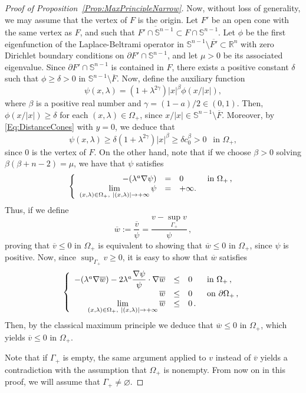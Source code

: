 \documentclass[12pt,reqno]{amsart}
\theoremstyle{definition}
\theoremstyle{remark}
\newcommand{\con}[1]{\mathbb{#1}}
\newcommand{\R}{\con{R}} %
\newcommand{\Sph}{\con{S}} %
\newcommand{\s}{\gamma}
\newcommand\beqc[1]{\left\{\begin{array}{#1}}
\newcommand\eeqc{\end{array} \right.}
\def\PDEsystem{rcll}
\let\div\relax
\DeclareMathOperator{\div}{div}
\def\ds{\displaystyle}
\numberwithin{equation}{section}
\begin{document}
\begin{proof}[Proof of Proposition~\ref{Prop:MaxPrincipleNarrow}]
	Now, without loss of generality, we may assume that the vertex of $F$ is the origin. Let $F'$ be an open cone with the same vertex as $F$, and such that $\overline{F'\cap \Sph^{n-1}} \subset F\cap \Sph^{n-1}$. Let $\phi$ be the first eigenfunction of the Laplace-Beltrami operator in $\Sph^{n-1} \setminus \overline{F'}\subset \R^n$ with zero Dirichlet boundary conditions on $\partial F' \cap \Sph^{n-1}$, and let $\mu>0$ be its associated eigenvalue. Since $\partial F' \cap \Sph^{n-1}$ is contained in $F$, there exists a positive constant $\delta$ such that $\phi\geq \delta > 0$ in $\Sph^{n-1} \setminus \overline{F}$. Now, define the auxiliary function
	$$ 
	\psi(x,\lambda) = (1+\lambda^{2\s}) |x|^\beta \phi(x/|x|), 
	$$
	where $\beta$ is a positive real number and $\s = (1-a)/2 \in (0,1)$. Then, $\phi(x/|x|)\geq \delta$ for each $(x,\lambda) \in \Omega_+$,  since $x/|x| \in \Sph^{n-1} \setminus \overline{F}$. Moreover, by \eqref{Eq:DistanceCones} with $y=0$, we deduce that
	$$ 
	\psi(x,\lambda) \geq \delta (1+\lambda^{2\s}) |x|^\beta \geq \delta c_0^\beta > 0 \ \ \text{ in } \Omega_+,
	$$
	since $0$ is the vertex of $F$.
	On the other hand, note that if we choose $\beta>0$ solving $\beta(\beta+n-2)=\mu$, we have that $\psi$ satisfies
	$$
	\beqc{\PDEsystem}
	-\div(\lambda^a \nabla \psi) &=& 0 & \text{ in } \Omega_+\,, \\
	\ds \lim_{(x,\lambda)\in \Omega_+, \ |(x,\lambda)|\to +\infty} \psi & = & +\infty.
	\eeqc
	$$
	Thus, if we define 
	$$\overline{w}:=\dfrac{\overline{v} }{\psi} = \dfrac{v - \sup_{\Gamma_+} v}{\psi}\,,$$
	proving that $\overline{v} \leq 0$ in $\Omega_+$ is equivalent to showing that $\overline{w}\leq 0$ in $\Omega_+$, since $\psi$ is positive. Now, since $\sup_{\Gamma_+} v \geq 0$, it is easy to show that $\overline{w}$ satisfies
	\begin{equation}
	\label{Eq:wTildeEquationNarrow}
	\beqc{\PDEsystem}
	-\div(\lambda^a \nabla \overline{w})-2\lambda^a\dfrac{\nabla \psi}{\psi}\cdot\nabla \overline{w} &\leq& 0 & \text{ in } \Omega_+\,, \\
	\overline{w} &\leq& 0 & \text{ on } \partial \Omega_+\,, \\
	\ds \lim_{(x,\lambda)\in \Omega_+, \ |(x,\lambda)|\to +\infty} \overline{w} & \leq & 0\,.
	\eeqc
	\end{equation}
	Then, by the classical maximum principle we deduce that $\overline{w}\leq 0$ in $\Omega_+$, which yields $\overline{v}\leq 0$ in $\Omega_+$.
	
	Note that if $\Gamma_+$ is empty, the same argument applied to $v$ instead of $\overline{v}$ yields a contradiction with the assumption that $\Omega_+$ is nonempty. From now on in this proof, we will assume that $\Gamma_+ \neq \varnothing$.
	

\end{proof}
\end{document}
